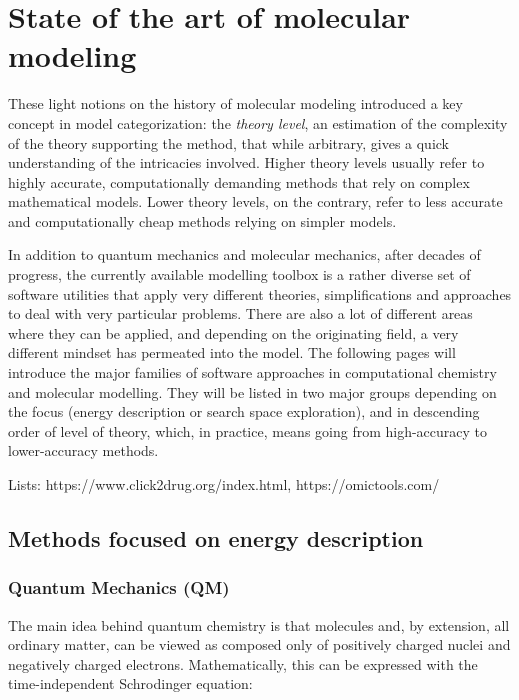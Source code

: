 
\section{State of the art of molecular modeling }
These light notions on the history of molecular modeling introduced a key concept in model categorization: the \textit{theory level}, an estimation of the complexity of the theory supporting the method, that while arbitrary, gives a quick understanding of the intricacies involved. Higher theory levels usually refer to highly accurate, computationally demanding methods that rely on complex mathematical models. Lower theory levels, on the contrary, refer to less accurate and computationally cheap methods relying on simpler models.

In addition to quantum mechanics and molecular mechanics, after decades of progress, the currently available modelling toolbox is a rather diverse set of software utilities that apply very different theories, simplifications and approaches to deal with very particular problems. There are also a lot of different areas where they can be applied, and depending on the originating field, a very different mindset has permeated into the model. The following pages will introduce the major families of software approaches in computational chemistry and molecular modelling. They will be listed in two major groups depending on the focus (energy description or search space exploration), and in descending order of level of theory, which, in practice, means going from high-accuracy to lower-accuracy methods.

Lists: https://www.click2drug.org/index.html, https://omictools.com/

\subsection{Methods focused on energy description}
\subsubsection{Quantum Mechanics (QM)}
The main idea behind quantum chemistry is that molecules and, by extension, all ordinary matter, can be viewed as composed only of positively charged nuclei and negatively charged electrons. Mathematically, this can be expressed with the time-independent Schrodinger equation:

